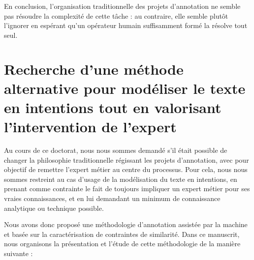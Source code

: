 		En conclusion, l'organisation traditionnelle des projets d'annotation ne semble pas résoudre la complexité de cette tâche : au contraire, elle semble plutôt l'ignorer en espérant qu'un opérateur humain suffisamment formé la résolve tout seul.
		
		
	\newpage
	\section*{Recherche d'une méthode alternative pour modéliser le texte en intentions tout en valorisant l'intervention de l'expert}
		
		Au cours de ce doctorat, nous nous sommes demandé s'il était possible de changer la philosophie traditionnelle régissant les projets d'annotation, avec pour objectif de remettre l'expert métier au centre du processus.
		Pour cela, nous nous sommes restreint au cas d'usage de la modélisation du texte en intentions, en prenant comme contrainte le fait de toujours impliquer un expert métier pour ses vraies connaissances, et en lui demandant un minimum de connaissance analytique ou technique possible.
		
		Nous avons donc proposé une méthodologie d'annotation assistée par la machine et basée sur la caractérisation de contraintes de similarité.
		Dans ce manuscrit, nous organisons la présentation et l'étude de cette méthodologie de la manière suivante :
		
